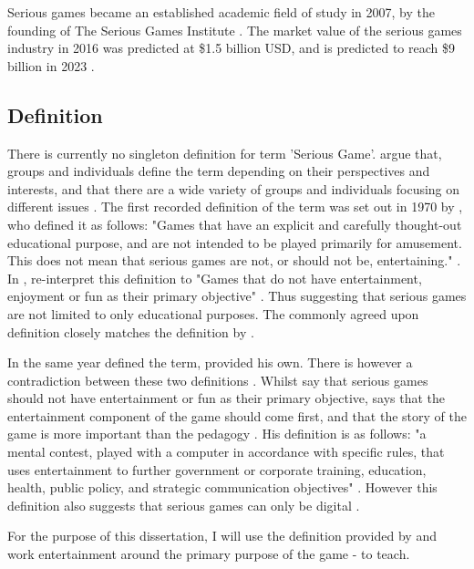 \documentclass[a4paper,11.5pt]{report}
\numberwithin{figure}{section}
\numberwithin{table}{section}
\numberwithin{equation}{section}
\numberwithin{equation}{section}
\begin{document}
Serious games became an established academic field of study in 2007, by the founding of The Serious Games Institute \citep{Wilkinson2016}. The market value of the serious games industry in 2016 was predicted at \$1.5 billion USD, and is predicted to reach \$9 billion in 2023 \citep{alliedmarketresearch}.

\subsection{Definition}

There is currently no singleton definition for term 'Serious Game'. \citeauthor{Johann2015} argue that, groups and individuals define the term depending on their perspectives and interests, and that there are a wide variety of groups and individuals focusing on different issues \citep{Johann2015}. The first recorded definition of the term was set out in 1970 by \citeauthor{abt1970} \citep{Wilkinson2016}, who defined it as follows: "Games that have an explicit and carefully thought-out educational purpose, and are not intended to be played primarily for amusement. This does not mean that serious games are not, or should not be, entertaining." \citep{abt1970}. In \citeyear{Michael2005}, \citeauthor{Michael2005} re-interpret this definition to "Games that do not have entertainment, enjoyment or fun as their primary objective" \citep{Michael2005}. Thus suggesting that serious games are not limited to only educational purposes. The commonly agreed upon definition closely matches the definition by \citeauthor{Michael2005} \citep[see][]{Johann2015}.

In the same year \citeauthor{Michael2005} defined the term, \citeauthor{Zyda2005} provided his own. There is however a contradiction between these two definitions \citep{Johann2015}. Whilst \citeauthor{Michael2005} say that serious games should not have entertainment or fun as their primary objective, \citeauthor{Zyda2005} says that the entertainment component of the game should come first, and that the story of the game is more important than the pedagogy \citep{Zyda2005}. His definition is as follows: "a mental contest, played with a computer in accordance with specific rules, that uses entertainment to further government or corporate training, education, health, public policy, and strategic communication objectives" \citep{Zyda2005}. However this definition also suggests that serious games can only be digital \citep{Jean}. 

For the purpose of this dissertation, I will use the definition provided by \citeauthor{abt1970} and work entertainment around the primary purpose of the game - to teach.
\end{document}
